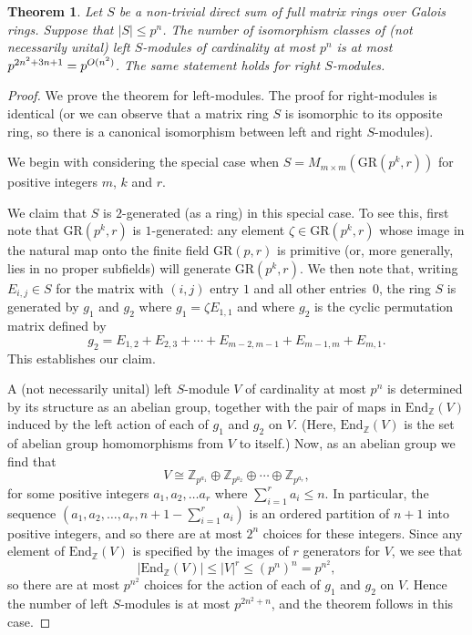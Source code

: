 \documentclass[12pt]{article}
\newtheorem{Thm}{Theorem}[section]
\newcommand{\Oh}{\mathnormal{O}}
\begin{document}
\begin{Thm}
\label{module_count}
Let $S$ be a non-trivial direct sum of full matrix rings over Galois rings. Suppose that $|S|\leq p^n$. The number of isomorphism classes of (not necessarily unital) left $S$-modules of cardinality at most $p^n$ is at most $p^{2n^2+3n+1}=p^{\Oh(n^2)}$.
The same statement holds for right $S$-modules.
\end{Thm}
\begin{proof}
We prove the theorem for left-modules. The proof for right-modules is identical (or we can observe that a matrix ring $S$ is isomorphic to its opposite ring, so there is a canonical isomorphism between left and right $S$-modules).

We begin with considering the special case when $S=M_{m\times m}(\mathrm{GR}(p^{k},r))$ for positive integers $m$, $k$ and $r$.

We claim that $S$ is $2$-generated (as a ring) in this special case. To see this, first note that $\mathrm{GR}(p^{k},r)$ is $1$-generated: any element $\zeta\in \mathrm{GR}(p^{k},r)$ whose image in the natural map onto the finite field $\mathrm{GR}(p,r)$ is primitive (or, more generally, lies in no proper subfields) will generate $\mathrm{GR}(p^{k},r)$. We then note that, writing $E_{i,j}\in S$ for the matrix with $(i,j)$ entry $1$ and all other entries~$0$, the ring $S$ is generated by $g_1$ and $g_2$ where $g_1=\zeta E_{1,1}$ and where $g_2$ is the cyclic permutation matrix defined by
\[
g_2=E_{1,2}+E_{2,3}+\cdots+E_{m-2,m-1}+E_{m-1,m}+E_{m,1}.
\]
This establishes our claim.

A (not necessarily unital) left $S$-module $V$ of cardinality at most $p^n$ is determined by its structure as an abelian group, together with the pair of maps in $\mathrm{End}_\mathbb{Z}(V)$ induced by the left action of each of $g_1$ and $g_2$ on $V$. (Here, $\mathrm{End}_\mathbb{Z}(V)$ is the set of abelian group homomorphisms from $V$ to itself.) Now, as an abelian group we find that
\[
V\cong\mathbb{Z}_{p^{a_1}}\oplus \mathbb{Z}_{p^{a_2}}\oplus \cdots \oplus \mathbb{Z}_{p^{a_r}},
\]
for some positive integers $a_1,a_2,\ldots a_r$ where $\sum_{i=1}^ra_i\leq n$. In particular, the sequence $(a_1,a_2,\ldots,a_r,n+1-\sum_{i=1}^ra_i)$ is an ordered partition of $n+1$ into positive integers, and so there are at most $2^n$ choices for these integers. Since any element of $\mathrm{End}_\mathbb{Z}(V)$ is specified by the images of $r$ generators for $V$, we see that
\[
|\mathrm{End}_\mathbb{Z}(V)|\leq |V|^r\leq (p^n)^n=p^{n^2},
\]
so there are at most $p^{n^2}$ choices for the action of each of $g_1$ and $g_2$ on $V$. Hence the number of left $S$-modules is at most $p^{2n^2+n}$, and the theorem follows in this case.


\end{proof}
\end{document}
